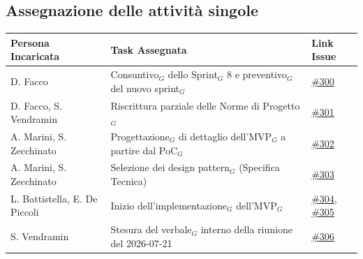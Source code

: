\documentclass[a4paper, 10pt, colorlinks=true, linkcolor=black, urlcolor=blue, citecolor=blue, hidelinks]{article}
\newcommand{\issue}[1]{\href{https://github.com/thebitless-group-swe/thebitless.github.io/issues/#1}{\##1}}
\begin{document}
\subsection{Assegnazione delle attività singole}
\begin{center}
    \renewcommand{\arraystretch}{1.4}
        \begin{tabular}{|p{4.2cm}|p{6.2cm}|p{2.2cm}|}
        \hline
        \textbf{Persona Incaricata} & \textbf{Task Assegnata} & \centering\textbf{Link Issue} \tabularnewline
        \hline
        D. Facco & Consuntivo$_G$ dello Sprint$_G$ 8 e preventivo$_G$ del nuovo sprint$_G$ & \issue{300} \\
        \hline
        D. Facco, S. Vendramin & Riscrittura parziale delle Norme di Progetto$_G$ & \issue{301} \\
        \hline
        A. Marini, S. Zecchinato & Progettazione$_G$ di dettaglio dell'MVP$_G$ a partire dal PoC$_G$ & \issue{302} \\
        \hline
        A. Marini, S. Zecchinato & Selezione dei design pattern$_G$ (Specifica Tecnica) & \issue{303} \\
        \hline
        L. Battistella, E. De Piccoli & Inizio dell'implementazione$_G$ dell'MVP$_G$ & \issue{304}, \issue{305} \\
        \hline
        S. Vendramin & Stesura del verbale$_G$ interno della riunione del 2026-07-21 & \issue{306} \\
        \hline
    \end{tabular}
\end{center}

\appendix
\end{document}
